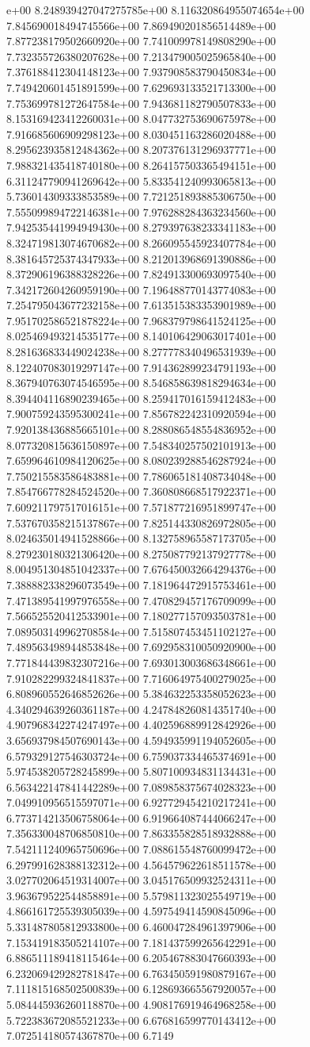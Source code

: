 e+00	8.248939427047275785e+00	8.116320864955074654e+00	7.845690018494745566e+00	7.869490201856514489e+00	7.877238179502660920e+00	7.741009978149808290e+00	7.732355726380207628e+00	7.213479005025965840e+00	7.376188412304148123e+00	7.937908583790450834e+00	7.749420601451891599e+00	7.629693133521713300e+00	7.753699781272647584e+00	7.943681182790507833e+00	8.153169423412260031e+00	8.047732753690675978e+00	7.916685606909298123e+00	8.030451163286020488e+00	8.295623935812484362e+00	8.207376131296937771e+00	7.988321435418740180e+00	8.264157503365494151e+00	6.311247790941269642e+00	5.833541240993065813e+00	5.736014309333853589e+00	7.721251893885306750e+00	7.555099894722146381e+00	7.976288284363234560e+00	7.942535441994949430e+00	8.279397638233341183e+00	8.324719813074670682e+00	8.266095545923407784e+00	8.381645725374347933e+00	8.212013968691390886e+00	8.372906196388328226e+00	7.824913300693097540e+00	7.342172604260959190e+00	7.196488770143774083e+00	7.254795043677232158e+00	7.613515383353901989e+00	7.951702586521878224e+00	7.968379798641524125e+00	8.025469493214535177e+00	8.140106429063017401e+00	8.281636833449024238e+00	8.277778340496531939e+00	8.122407083019297147e+00	7.914362899234791193e+00	8.367940763074546595e+00	8.546858639818294634e+00	8.394404116890239465e+00	8.259417016159412483e+00	7.900759243595300241e+00	7.856782242310920594e+00	7.920138436885665101e+00	8.288086548554836952e+00	8.077320815636150897e+00	7.548340257502101913e+00	7.659964610984120625e+00	8.080239288546287924e+00	7.750215583586483881e+00	7.786065181408734048e+00	7.854766778284524520e+00	7.360808668517922371e+00	7.609211797517016151e+00	7.571877216951899747e+00	7.537670358215137867e+00	7.825144330826972805e+00	8.024635014941528866e+00	8.132758965587173705e+00	8.279230180321306420e+00	8.275087792137927778e+00	8.004951304851042337e+00	7.676450032664294376e+00	7.388882338296073549e+00	7.181964472915753461e+00	7.471389541997976558e+00	7.470829457176709099e+00	7.566525520412533901e+00	7.180277157093503781e+00	7.089503149962708584e+00	7.515807453451102127e+00	7.489563498944853848e+00	7.692958310050920900e+00	7.771844439832307216e+00	7.693013003686348661e+00	7.910282299324841837e+00	7.716064975400279025e+00	6.808960552646852626e+00	5.384632253358052623e+00	4.340294639260361187e+00	4.247848260814351740e+00	4.907968342274247497e+00	4.402596889912842926e+00	3.656937984507690143e+00	4.594935991194052605e+00	6.579329127546303724e+00	6.759037334465374691e+00	5.974538205728245899e+00	5.807100934831134431e+00	6.563422147841442289e+00	7.089858375674028323e+00	7.049910956515597071e+00	6.927729454210217241e+00	6.773714213506758064e+00	6.919664087444066247e+00	7.356330048706850810e+00	7.863355828518932888e+00	7.542111240965750696e+00	7.088615548760099472e+00	6.297991628388132312e+00	4.564579622618511578e+00	3.027702064519314007e+00	3.045176509932524311e+00	3.963679522544858891e+00	5.579811323025549719e+00	4.866161725539305039e+00	4.597549414590845096e+00	5.331487805812933800e+00	6.460047284961397906e+00	7.153419183505214107e+00	7.181437599265642291e+00	6.886511189418115464e+00	6.205467883047660393e+00	6.232069429282781847e+00	6.763450591980879167e+00	7.111815168502500839e+00	6.128693665567920057e+00	5.084445936260118870e+00	4.908176919464968258e+00	5.722383672085521233e+00	6.676816599770143412e+00	7.072514180574367870e+00	6.7149
